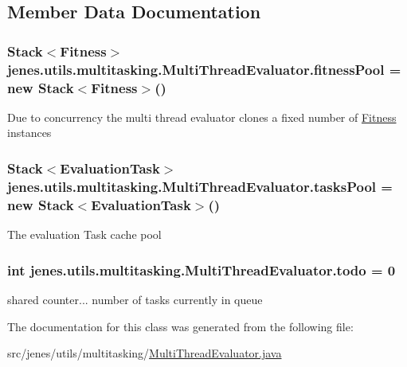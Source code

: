 \subsection{Member Data Documentation}
\hypertarget{classjenes_1_1utils_1_1multitasking_1_1_multi_thread_evaluator_aa8b1d2ff749ebd5fd37f9a7f5b419260}{
\subsubsection[{fitness\-Pool}]{\setlength{\rightskip}{0pt plus 5cm}Stack$<$Fitness$>$ jenes.\-utils.\-multitasking.\-Multi\-Thread\-Evaluator.\-fitness\-Pool = new Stack$<$Fitness$>$()\hspace{0.3cm}{\ttfamily [private]}}}\label{classjenes_1_1utils_1_1multitasking_1_1_multi_thread_evaluator_aa8b1d2ff749ebd5fd37f9a7f5b419260}
Due to concurrency the multi thread evaluator clones a fixed number of \hyperlink{}{Fitness} instances \hypertarget{classjenes_1_1utils_1_1multitasking_1_1_multi_thread_evaluator_a672829f7b70815c7bb1c9379ab403312}{
\subsubsection[{tasks\-Pool}]{\setlength{\rightskip}{0pt plus 5cm}Stack$<${\bf Evaluation\-Task}$>$ jenes.\-utils.\-multitasking.\-Multi\-Thread\-Evaluator.\-tasks\-Pool = new Stack$<${\bf Evaluation\-Task}$>$()\hspace{0.3cm}{\ttfamily [private]}}}\label{classjenes_1_1utils_1_1multitasking_1_1_multi_thread_evaluator_a672829f7b70815c7bb1c9379ab403312}
The evaluation Task cache pool \hypertarget{classjenes_1_1utils_1_1multitasking_1_1_multi_thread_evaluator_aa6a82db6c77826d99c361ce5959ae441}{
\subsubsection[{todo}]{\setlength{\rightskip}{0pt plus 5cm}int jenes.\-utils.\-multitasking.\-Multi\-Thread\-Evaluator.\-todo = 0\hspace{0.3cm}{\ttfamily [private]}}}\label{classjenes_1_1utils_1_1multitasking_1_1_multi_thread_evaluator_aa6a82db6c77826d99c361ce5959ae441}
shared counter... number of tasks currently in queue 

The documentation for this class was generated from the following file\-:\begin{DoxyCompactItemize}
\item 
src/jenes/utils/multitasking/\hyperlink{_multi_thread_evaluator_8java}{Multi\-Thread\-Evaluator.\-java}\end{DoxyCompactItemize}

